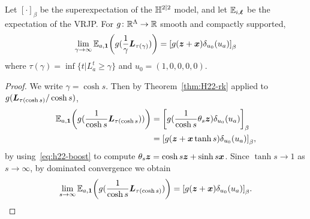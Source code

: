 \documentclass[11pt,a4paper]{article}
\let\originalleft\left
\let\originalright\right
\renewcommand{\left}{\mathopen{}\mathclose\bgroup\originalleft}
\renewcommand{\right}{\aftergroup\egroup\originalright}
\begin{document}
\begin{corollary}
  \label{cor:st-es}
  Let $[\cdot]_\beta$ be the superexpectation of the $\mathbb{H}^{2|2}$
  model, and let $\mathbb{E}_{i,\boldsymbol{\ell}}$ be the expectation of the VRJP.
  For $g\colon\mathbb{R}^{\Lambda}\to \mathbb{R}$ smooth and compactly
    supported, %
  \begin{equation}
    \label{eq:st-es}
    \lim_{\gamma \rightarrow \infty}\E_{a,\V{1}}\left(g(\frac{1}{\gamma}\V{L}_{\tau(\gamma)})\right)
    = \uspin{g(\V{z}+ \V{x})\delta_{u_{0}}(u_a)}_{\beta}
  \end{equation}
  where $\tau(\gamma) = \inf\{t | L_a^t \geq \gamma\}$ and
  $u_{0}=(1,0,0,0,0)$.
\end{corollary}
\begin{proof}
  We write $\gamma=\cosh s$. Then by Theorem~\ref{thm:H22-rk} applied
  to $g(\boldsymbol{L}_{\tau(\cosh s)}/\cosh s)$, 
  \begin{align}
    \E_{a,\V{1}}\left( g( \frac{1}{\cosh s}\V{L}_{\tau(\cosh s}))\right)
    &= 
      \uspin{g(\frac{1}{\cosh s}\theta_s \V{z})\delta_{u_{0}}(u_a)}_{\beta}
      \nnb
    &= 
      \uspin{g(\V{z}+ \V{x}\tanh{s})\delta_{u_0}(u_a)}_{\beta},
  \end{align}
  by using~\eqref{eq:h22-boost} to compute $\theta_{s}\boldsymbol{z} = \cosh s
  \boldsymbol{z} + \sinh s \boldsymbol{x}$.  Since
  $\tanh s \to 1$ as $s\to\infty$, by dominated convergence we obtain
  \begin{equation*}
    \lim_{s \rightarrow \infty}
    \E_{a,\V{1}}\left(g(\frac{1}{\cosh s}\V{L}_{\tau(\cosh s)})\right)
    = \uspin{g(\V{z}+ \V{x})\delta_{u_0}(u_a)}_{\beta}.
    \qedhere
\end{equation*}
\end{proof}
\end{document}
